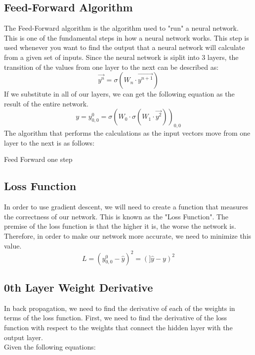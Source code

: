 \documentclass[10pt]{article}
\begin{document}
\subsection{Feed-Forward Algorithm}
The Feed-Forward algorithm is the algorithm used to "run" a neural network. This is one of the fundamental steps in how a neural network works. This step is used whenever you want to find the output that a neural network will calculate from a given set of inputs. Since the neural network is siplit into 3 layers, the transition of the values from one layer to the next can be described as:
$$\vec{y^n} = \sigma(W_{n} \cdot \vec{y^{n+1}})$$
If we substitute in all of our layers, we can get the following equation as the result of the entire network.
$$y = y^0_{0,0} = \sigma(W_0 \cdot \sigma(W_1 \cdot \vec{y^2}))_{0,0}$$
The algorithm that performs the calculations as the input vectors move from one layer to the next is as follows:
\begin{algorithm}[H]
    \caption{Feed Forward one step}
\end{algorithm}
\subsection{Loss Function}
In order to use gradient descent, we will need to create a function that measures the correctness of our network. This is known as the "Loss Function". The premise of the loss function is that the higher it is, the worse the network is. Therefore, in order to make our network more accurate, we need to minimize this value.
$$L = (y^0_{0,0} - \hat{y} )^2 = (]\hat{y} - y)^2$$

\subsection{0th Layer Weight Derivative}

In back propagation, we need to find the derivative of each of the weights in terms of the loss function. First, we need to find the derivative of the loss function with respect to the weights that connect the hidden layer with the output layer.\\
Given the following equations:
\end{document}
